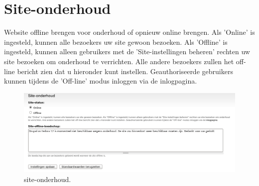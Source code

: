 \section{Site-onderhoud} 
    Website offline brengen voor onderhoud of opnieuw online brengen. Als
    'Online'  is ingesteld, kunnen alle bezoekers uw site gewoon
    bezoeken. Als 'Offline'  is ingesteld, kunnen alleen
    gebruikers met de 'Site-instellingen beheren' rechten uw site bezoeken om onderhoud te verrichten. Alle andere
    bezoekers zullen het off-line bericht zien dat u hieronder kunt instellen. 
    Geauthoriseerde gebruikers kunnen tijdens de 'Off-line' modus inloggen via
    de inlogpagina.
 \begin{figure}[!h]
    \centering
   \includegraphics[scale=0.3,angle=0]{site-onderhoud}
   \caption{site-onderhoud.\label{white}}
 \end{figure}   
    
